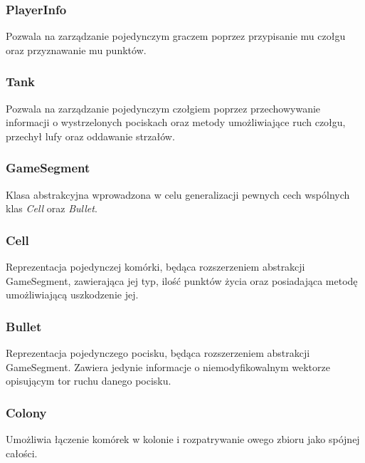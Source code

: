 \documentclass[11pt,a4paper]{report}
\begin{document}
\subsubsection{PlayerInfo}
Pozwala na zarządzanie pojedynczym graczem poprzez przypisanie mu czołgu oraz przyznawanie mu punktów.

\subsubsection{Tank}
Pozwala na zarządzanie pojedynczym czołgiem poprzez przechowywanie informacji o wystrzelonych pociskach oraz metody umożliwiające ruch czołgu, przechył lufy oraz oddawanie strzałów.

\subsubsection{GameSegment}
Klasa abstrakcyjna wprowadzona w celu generalizacji pewnych cech wspólnych klas \textsl{Cell} oraz \textsl{Bullet}.

\subsubsection{Cell}
Reprezentacja pojedynczej komórki, będąca rozszerzeniem abstrakcji GameSegment, zawierająca jej typ, ilość punktów życia oraz posiadająca metodę umożliwiającą uszkodzenie jej.

\subsubsection{Bullet}
Reprezentacja pojedynczego pocisku, będąca rozszerzeniem abstrakcji GameSegment. Zawiera jedynie informacje o niemodyfikowalnym wektorze opisującym tor ruchu danego pocisku.

\subsubsection{Colony}
Umożliwia łączenie komórek w kolonie i rozpatrywanie owego zbioru jako spójnej całości.
\newpage
\end{document}
